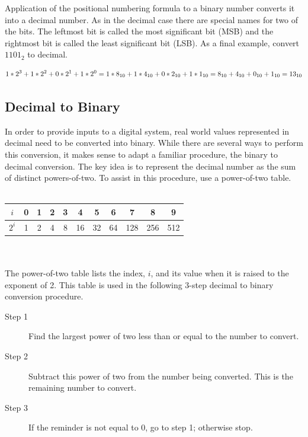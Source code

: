 Application of the positional numbering formula to a binary number
converts it into a decimal number.  As in the decimal case
there are special names for two of the bits. The leftmost bit is
called the most significant bit (MSB) and the
rightmost bit is called the least significant
bit (LSB).  As a final example, convert $1101_2$ to decimal.

$$1*2^3 + 1*2^2 + 0*2^1 + 1*2^0 = \\
1*8_{10} + 1*4_{10} + 0*2_{10} + 1*1_{10} = \\
8_{10} + 4_{10} + 0_{10} + 1_{10} = 13_{10}$$
\label{page:bin2dec}

\subsection{Decimal to Binary}
In order to provide inputs to a digital system, real world values
represented in decimal need to be converted into binary.
While there are several ways to perform
this conversion, it makes sense to adapt a familiar procedure,
the binary to decimal conversion.  The key idea is to represent the
decimal number as the sum of distinct powers-of-two.  To assist in this
procedure, use a power-of-two table.
\\ \\
\begin{tabular}{|c|c|c|c|c|c|c|c|c|c|c|}\hline
    $i$   & 0 & 1 &  2 &  3 &  4 &  5 &  6 &  7  &  8  &  9  \\ \hline
    $2^i$ & 1 & 2 &  4 &  8 & 16 & 32 & 64 & 128 & 256 &  512\\ \hline
\end{tabular}
\\ \\
The power-of-two table lists the index, $i$, and its value when it is
raised to the exponent of 2.  This table is used in the following
3-step decimal to binary conversion procedure.

\begin{description}
    \item [Step 1] Find the largest power of two less than or equal to the
        number to convert.
    \item [Step 2] Subtract this power of two from the number being converted.
        This is the remaining number to convert.
    \item [Step 3] If the reminder is not equal to 0, go to step 1; otherwise stop.
\end{description}

